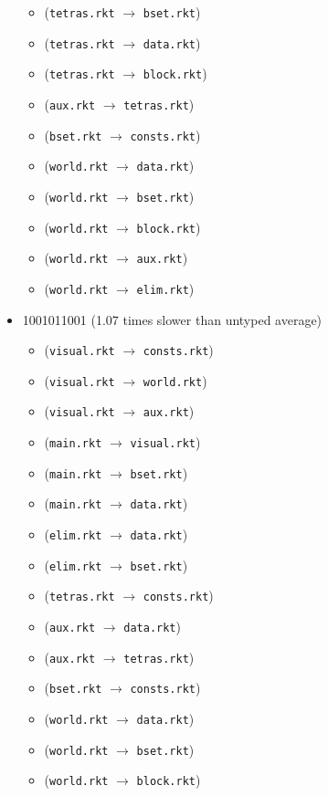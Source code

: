 \documentclass{article}
\newcommand{\mono}[1]{\texttt{#1}}
\begin{document}
\begin{itemize}
\begin{itemize}
  \item (\mono{tetras.rkt} $\rightarrow$ \mono{bset.rkt})
  \item (\mono{tetras.rkt} $\rightarrow$ \mono{data.rkt})
  \item (\mono{tetras.rkt} $\rightarrow$ \mono{block.rkt})
  \item (\mono{aux.rkt} $\rightarrow$ \mono{tetras.rkt})
  \item (\mono{bset.rkt} $\rightarrow$ \mono{consts.rkt})
  \item (\mono{world.rkt} $\rightarrow$ \mono{data.rkt})
  \item (\mono{world.rkt} $\rightarrow$ \mono{bset.rkt})
  \item (\mono{world.rkt} $\rightarrow$ \mono{block.rkt})
  \item (\mono{world.rkt} $\rightarrow$ \mono{aux.rkt})
  \item (\mono{world.rkt} $\rightarrow$ \mono{elim.rkt})
  \end{itemize}
\item 1001011001 (1.07 times slower than untyped average)
  \begin{itemize}
  \item (\mono{visual.rkt} $\rightarrow$ \mono{consts.rkt})
  \item (\mono{visual.rkt} $\rightarrow$ \mono{world.rkt})
  \item (\mono{visual.rkt} $\rightarrow$ \mono{aux.rkt})
  \item (\mono{main.rkt} $\rightarrow$ \mono{visual.rkt})
  \item (\mono{main.rkt} $\rightarrow$ \mono{bset.rkt})
  \item (\mono{main.rkt} $\rightarrow$ \mono{data.rkt})
  \item (\mono{elim.rkt} $\rightarrow$ \mono{data.rkt})
  \item (\mono{elim.rkt} $\rightarrow$ \mono{bset.rkt})
  \item (\mono{tetras.rkt} $\rightarrow$ \mono{consts.rkt})
  \item (\mono{aux.rkt} $\rightarrow$ \mono{data.rkt})
  \item (\mono{aux.rkt} $\rightarrow$ \mono{tetras.rkt})
  \item (\mono{bset.rkt} $\rightarrow$ \mono{consts.rkt})
  \item (\mono{world.rkt} $\rightarrow$ \mono{data.rkt})
  \item (\mono{world.rkt} $\rightarrow$ \mono{bset.rkt})
  \item (\mono{world.rkt} $\rightarrow$ \mono{block.rkt})

\end{itemize}
\end{itemize}
\end{document}
